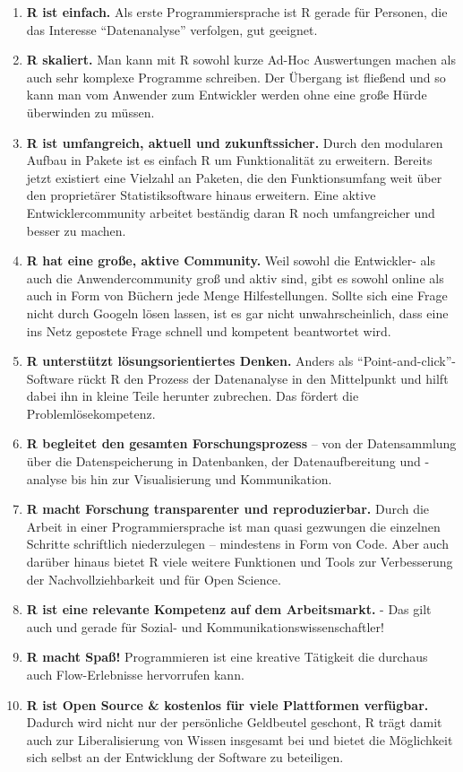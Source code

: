\documentclass[
]{book}
\begin{document}
\begin{enumerate}
\def\labelenumi{\arabic{enumi}.}
\item
  \textbf{R ist einfach.} Als erste Programmiersprache ist R gerade für Personen, die das Interesse ``Datenanalyse'' verfolgen, gut geeignet.
\item
  \textbf{R skaliert.} Man kann mit R sowohl kurze Ad-Hoc Auswertungen machen als auch sehr komplexe Programme schreiben. Der Übergang ist fließend und so kann man vom Anwender zum Entwickler werden ohne eine große Hürde überwinden zu müssen.
\item
  \textbf{R ist umfangreich, aktuell und zukunftssicher.} Durch den modularen Aufbau in Pakete ist es einfach R um Funktionalität zu erweitern. Bereits jetzt existiert eine Vielzahl an Paketen, die den Funktionsumfang weit über den proprietärer Statistiksoftware hinaus erweitern. Eine aktive Entwicklercommunity arbeitet beständig daran R noch umfangreicher und besser zu machen.
\item
  \textbf{R hat eine große, aktive Community.} Weil sowohl die Entwickler- als auch die Anwendercommunity groß und aktiv sind, gibt es sowohl online als auch in Form von Büchern jede Menge Hilfestellungen. Sollte sich eine Frage nicht durch Googeln lösen lassen, ist es gar nicht unwahrscheinlich, dass eine ins Netz gepostete Frage schnell und kompetent beantwortet wird.
\item
  \textbf{R unterstützt lösungsorientiertes Denken.} Anders als ``Point-and-click''-Software rückt R den Prozess der Datenanalyse in den Mittelpunkt und hilft dabei ihn in kleine Teile herunter zubrechen. Das fördert die Problemlösekompetenz.
\item
  \textbf{R begleitet den gesamten Forschungsprozess} -- von der Datensammlung über die Datenspeicherung in Datenbanken, der Datenaufbereitung und -analyse bis hin zur Visualisierung und Kommunikation.
\item
  \textbf{R macht Forschung transparenter und reproduzierbar.} Durch die Arbeit in einer Programmiersprache ist man quasi gezwungen die einzelnen Schritte schriftlich niederzulegen -- mindestens in Form von Code. Aber auch darüber hinaus bietet R viele weitere Funktionen und Tools zur Verbesserung der Nachvollziehbarkeit und für Open Science.
\item
  \textbf{R ist eine relevante Kompetenz auf dem Arbeitsmarkt.} - Das gilt auch und gerade für Sozial- und Kommunikationswissenschaftler!
\item
  \textbf{R macht Spaß!} Programmieren ist eine kreative Tätigkeit die durchaus auch Flow-Erlebnisse hervorrufen kann.
\item
  \textbf{R ist Open Source \& kostenlos für viele Plattformen verfügbar.} Dadurch wird nicht nur der persönliche Geldbeutel geschont, R trägt damit auch zur Liberalisierung von Wissen insgesamt bei und bietet die Möglichkeit sich selbst an der Entwicklung der Software zu beteiligen.
\end{enumerate}
\end{document}
